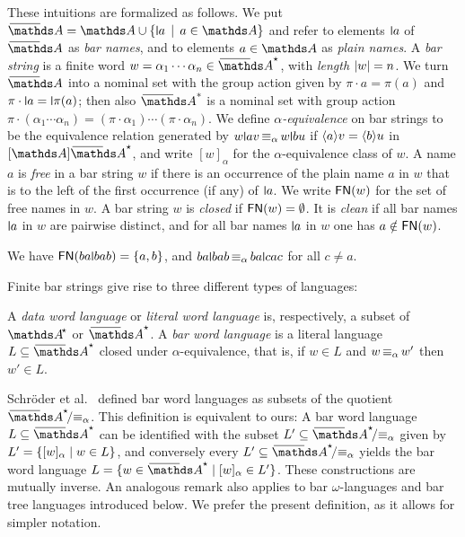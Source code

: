 \documentclass[a4paper,UKenglish,cleveref,autoref,thm-restate,numberwithinsect,final]{lipics-v2021}
\begin{document}
   These intuitions are formalized as follows. We put $\barNames = \names \cup \setw{\newletter{a}}{a \in \names}$ and refer to elements $\newletter{a}$ of $\barNames$ as \emph{bar names}, and to elements $a \in \names$ as \emph{plain names}.
        A \emph{bar string} is a finite word $w = \alpha_1 \cdots \alpha_n \in \barAs$, with \emph{length} $\abs{w} = n$.
        We turn $\barNames$ into a nominal set with the group action given by $\pi \cdot a = \pi(a)$ and $\pi \cdot \newletter{a} = \newletter{\pi(a)}$; then also $\barNames^*$ is a nominal set with group action $\pi\cdot (\alpha_1\cdots \alpha_n)=(\pi\cdot \alpha_1)\cdots (\pi\cdot \alpha_n)$.
        We define \emph{$\alpha$-equivalence} on bar strings to be the equivalence relation generated by $w\newletter{a}v \alphaequiv w\newletter{b}u$ if $\langle a \rangle v = \langle b \rangle u$ in $\Abstr{\barAs}$, and
        write $[w]_\alpha$ for the $\alpha$-equivalence class of $w$. 
        A name $a$ is \emph{free} in a bar string $w$ if there is an occurrence of the plain name $a$ in $w$ that is to the left of the first occurrence (if any) of $\newletter{a}$.
        We write $\mathsf{FN}(w)$ for the set of free names in $w$.
        A bar string $w$ is \emph{closed} if $\mathsf{FN}(w) = \emptyset$.
        It is \emph{clean} if all bar names $\newletter{a}$ in $w$ are pairwise
        distinct, and for all bar names $\newletter{a}$ in $w$ one has $a \notin \mathsf{FN}(w)$. 
    \begin{expl} We have $\FN(ba\newletter{b}ab)=\{a,b\}$, and $ba\newletter{b}ab\alphaequiv ba\newletter{c}ac$ for all $c\neq a$.
    \end{expl}
  Finite bar strings give rise to three different types of languages:
    \begin{defn}
        A \emph{data word language} or \emph{literal word language} is, respectively, a subset of $\Ats$ or $\barAs$.
        A \emph{bar word language} is a literal language $L\seq \barAs$ closed under $\alpha$-equivalence, that is, if $w\in L$ and $w\operatorname{\equiv_{\alpha}} w'$ then $w'\in L$.
    \end{defn}
    \begin{rem}
      Schröder et al.~\cite{skmw17} defined bar word languages as subsets of the quotient $\quotient{\barAs\!}{\alphaequiv}$. This definition is equivalent to ours: A bar word language $L\seq \barAs$ can be identified with the subset $L'\seq \quotient{\barAs\!}{\alphaequiv}$ given by $L'= \{[w]_\alpha \mid w\in L\}$, and conversely every $L'\seq \quotient{\barAs\!}{\alphaequiv}$ yields the bar word language $L=\set{w\in \barAs \mid [w]_\alpha\in L'}$. These constructions are mutually inverse. An analogous remark also applies to bar $\omega$-languages and bar tree languages introduced below. We prefer the present definition, as it allows for simpler notation.
    \end{rem}
\end{document}
